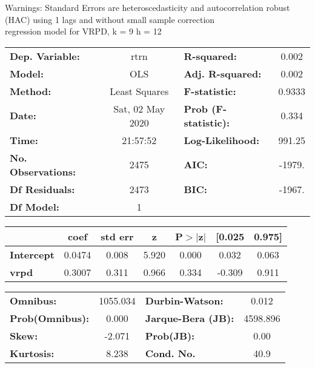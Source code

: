 Warnings: \newline
 [1] Standard Errors are heteroscedasticity and autocorrelation robust (HAC) using 1 lags and without small sample correction\\ 

regression model for VRPD, k = 9 h = 12\begin{center}
\begin{tabular}{lclc}
\toprule
\textbf{Dep. Variable:}    &       rtrn       & \textbf{  R-squared:         } &     0.002   \\
\textbf{Model:}            &       OLS        & \textbf{  Adj. R-squared:    } &     0.002   \\
\textbf{Method:}           &  Least Squares   & \textbf{  F-statistic:       } &    0.9333   \\
\textbf{Date:}             & Sat, 02 May 2020 & \textbf{  Prob (F-statistic):} &    0.334    \\
\textbf{Time:}             &     21:57:52     & \textbf{  Log-Likelihood:    } &    991.25   \\
\textbf{No. Observations:} &        2475      & \textbf{  AIC:               } &    -1979.   \\
\textbf{Df Residuals:}     &        2473      & \textbf{  BIC:               } &    -1967.   \\
\textbf{Df Model:}         &           1      & \textbf{                     } &             \\
\bottomrule
\end{tabular}
\begin{tabular}{lcccccc}
                   & \textbf{coef} & \textbf{std err} & \textbf{z} & \textbf{P$> |$z$|$} & \textbf{[0.025} & \textbf{0.975]}  \\
\midrule
\textbf{Intercept} &       0.0474  &        0.008     &     5.920  &         0.000        &        0.032    &        0.063     \\
\textbf{vrpd}      &       0.3007  &        0.311     &     0.966  &         0.334        &       -0.309    &        0.911     \\
\bottomrule
\end{tabular}
\begin{tabular}{lclc}
\textbf{Omnibus:}       & 1055.034 & \textbf{  Durbin-Watson:     } &    0.012  \\
\textbf{Prob(Omnibus):} &   0.000  & \textbf{  Jarque-Bera (JB):  } & 4598.896  \\
\textbf{Skew:}          &  -2.071  & \textbf{  Prob(JB):          } &     0.00  \\
\textbf{Kurtosis:}      &   8.238  & \textbf{  Cond. No.          } &     40.9  \\
\bottomrule
\end{tabular}
\end{center}


